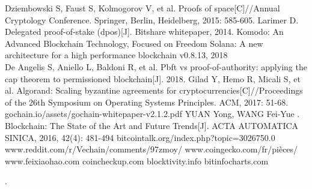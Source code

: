 \documentclass[doublespacing]{bmcart}
\begin{document}
\begin{CJK*}{UTF8}{gbsn}
\begin{thebibliography}{99}
 Dziembowski S, Faust S, Kolmogorov V, et al. Proofs of space[C]//Annual Cryptology Conference. Springer, Berlin, Heidelberg, 2015: 585-605.
 Larimer D. Delegated proof-of-stake (dpos)[J]. Bitshare whitepaper, 2014.
 Komodo: An Advanced Blockchain Technology, Focused on Freedom
 Solana: A new architecture for a high
performance blockchain v0.8.13, 2018\\
 De Angelis S, Aniello L, Baldoni R, et al. Pbft vs proof-of-authority: applying the cap theorem to permissioned blockchain[J]. 2018.
 Gilad Y, Hemo R, Micali S, et al. Algorand: Scaling byzantine agreements for cryptocurrencies[C]//Proceedings of the 26th Symposium on Operating Systems Principles. ACM, 2017: 51-68.
 gochain.io/assets/gochain-whitepaper-v2.1.2.pdf
 YUAN Yong, WANG Fei-Yue	. Blockchain: The State of the Art and Future Trends[J]. ACTA AUTOMATICA SINICA, 2016, 42(4): 481-494
  bitcointalk.org/index.php?topic=3026750.0
www.reddit.com/r/Vechain/comments/97zmoy/
www.coingecko.com/fr/pièces/
www.feixiaohao.com
coincheckup.com
blocktivity.info
bitinfocharts.com
	\end{thebibliography}
	.
\end{CJK*}
\end{document}

